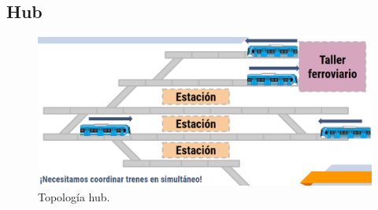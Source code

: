 \subsection{Hub}

\lipsum[1]

    \begin{figure}[h]
        \centering
        \includegraphics[width=1\textwidth]{Figuras/hub}
        \centering\caption{Topología hub.}
        \label{fig:hub_1}
    \end{figure}
    
\lipsum[1]
